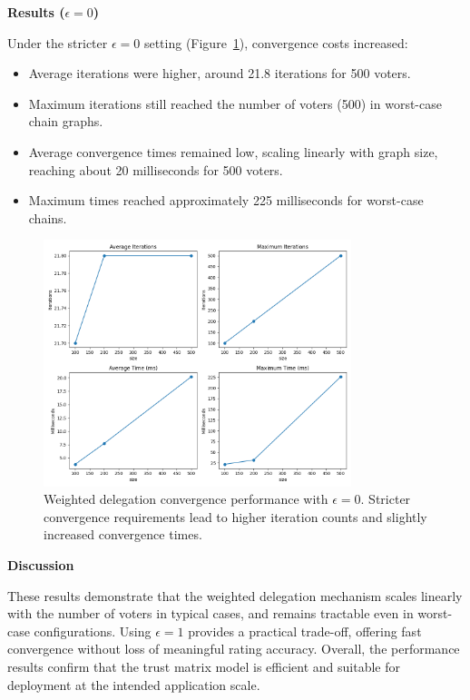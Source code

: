 \textbf{Results ($\epsilon = 0$)}  

Under the stricter $\epsilon = 0$ setting (Figure~\ref{fig:e0_perf}), convergence costs increased:
\begin{itemize}
    \item Average iterations were higher, around 21.8 iterations for 500 voters.
    \item Maximum iterations still reached the number of voters (500) in worst-case chain graphs.
    \item Average convergence times remained low, scaling linearly with graph size, reaching about 20 milliseconds for 500 voters.
    \item Maximum times reached approximately 225 milliseconds for worst-case chains.
\end{itemize}

\begin{figure}[H]
    \centering
    \includegraphics[width=0.8\textwidth]{../common/perf_graphs/e_0.png}
    \caption{Weighted delegation convergence performance with $\epsilon = 0$. Stricter convergence requirements lead to higher iteration counts and slightly increased convergence times.}
    \label{fig:e0_perf}
\end{figure}

\textbf{Discussion}  

These results demonstrate that the weighted delegation mechanism scales linearly with the number of voters in typical cases, and remains tractable even in worst-case configurations. Using $\epsilon = 1$ provides a practical trade-off, offering fast convergence without loss of meaningful rating accuracy. Overall, the performance results confirm that the trust matrix model is efficient and suitable for deployment at the intended application scale.


